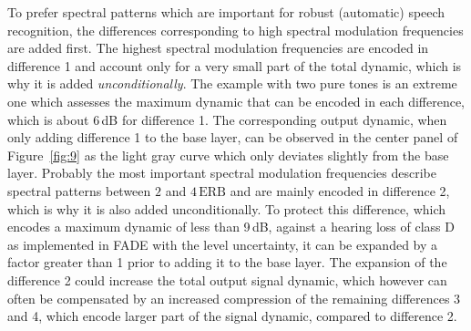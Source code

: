 \documentclass[10pt,a4paper,twocolumn]{article}
\begin{document}
To prefer spectral patterns which are important for robust (automatic) speech recognition, the differences corresponding to high spectral modulation frequencies are added first.
%
The highest spectral modulation frequencies are encoded in difference 1 and account only for a very small part of the total dynamic, which is why it is added \emph{unconditionally}.
%
The example with two pure tones is an extreme one which assesses the maximum dynamic that can be encoded in each difference, which is about 6\,dB for difference 1.
%
The corresponding output dynamic, when only adding difference 1 to the base layer, can be observed in the center panel of Figure~\ref{fig:9} as the light gray curve which only deviates slightly from the base layer.
%
Probably the most important spectral modulation frequencies describe spectral patterns between $2$ and $4\,\text{ERB}$ and are mainly encoded in difference 2, which is why it is also added unconditionally.
%
To protect this difference, which encodes a maximum dynamic of less than 9\,dB, against a hearing loss of class D as implemented in FADE with the level uncertainty, it can be expanded by a factor greater than 1 prior to adding it to the base layer.
%
The expansion of the difference 2 could increase the total output signal dynamic, which however can often be compensated by an increased compression of the remaining differences 3 and 4, which encode larger part of the signal dynamic, compared to difference 2.
\end{document}
